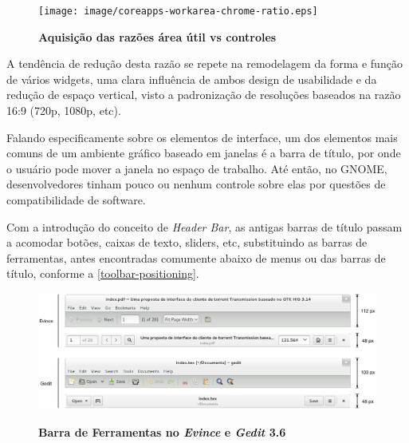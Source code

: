 \begin{table}[htb]
\end{table}

\begin{figure}[!ht]
  \begin{center}
    \caption{\textbf{Aquisição das razões área útil vs controles}}
    \texttt{[image: image/coreapps-workarea-chrome-ratio.eps]}
    \label{coreapps-workarea-vs-chrome}
  \end{center}
\end{figure}


A tendência de redução desta razão se repete na remodelagem da forma e função de
vários widgets, uma clara influência de ambos design de usabilidade e da redução
de espaço vertical, visto a padronização de resoluções baseados na razão 16:9
(720p, 1080p, etc).

Falando especificamente sobre os elementos de interface, um dos elementos mais
comuns de um ambiente gráfico baseado em janelas é a barra de título, por onde o
usuário pode mover a janela no espaço de trabalho. Até então, no GNOME,
desenvolvedores tinham pouco ou nenhum controle sobre elas por questões de
compatibilidade de software.

Com a introdução do conceito de \textit{Header Bar}, as antigas barras de título
passam a acomodar botões, caixas de texto, sliders, etc, substituindo as barras
de ferramentas, antes encontradas comumente abaixo de menus ou das barras de
título, conforme a \autoref{toolbar-positioning}.

\begin{figure}[!ht]
  \begin{center}
    \caption{\textbf{Barra de Ferramentas no \textit{Evince} e \textit{Gedit} 3.6}}
    \includegraphics [width=\textwidth]{image/toolbar-headerbar-comparison.eps}
    \label{toolbar-positioning}
  \end{center}
\end{figure}

